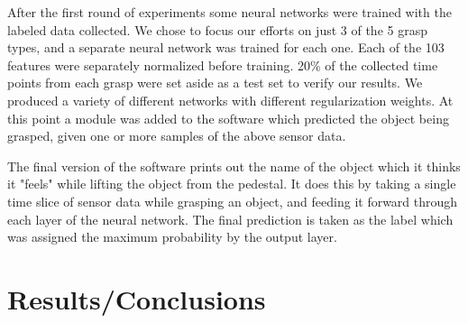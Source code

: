 \documentclass[12pt, oneside]{article}
\begin{document}
After the first round of experiments some neural networks were trained with the labeled data collected. We chose to focus our efforts on just 3 of the 5 grasp types, and a separate neural network was trained for each one. Each of the 103 features were separately normalized before training. 20\% of the collected time points from each grasp were set aside as a test set to verify our results. We produced a variety of different networks with different regularization weights. At this point a module was added to the software which predicted the object being grasped, given one or more samples of the above sensor data.

The final version of the software prints out the name of the object which it thinks it "feels" while lifting the object from the pedestal. It does this by taking a single time slice of sensor data while grasping an object, and feeding it forward through each layer of the neural network. The final prediction is taken as the label which was assigned the maximum probability by the output layer.

\section{Results/Conclusions}
\end{document}
